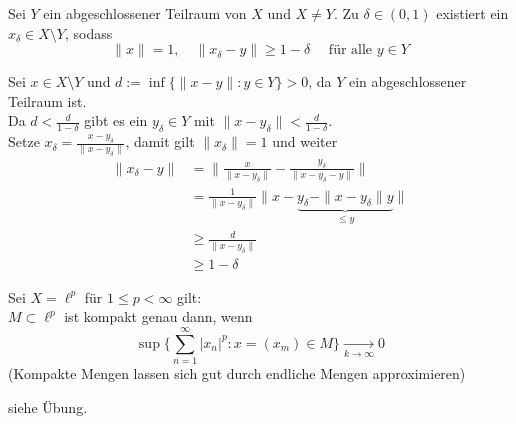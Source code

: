 \begin{lemma}[Riesz] \label{lemma:6.3-riesz} 
	Sei $Y$ ein abgeschlossener Teilraum von $X$ und $X \neq Y$. Zu $\delta \in (0, 1)$ existiert ein $x_{\delta} \in X \setminus Y$, sodass
	\[ \| x \| = 1, \quad \| x_{\delta} - y\| \geq 1 - \delta \quad \text{ für alle } y \in Y \]
\end{lemma}
\begin{beweis}
	Sei $x \in X \setminus Y$ und $d := \inf \{ \| x - y \|: y \in Y \} > 0$, da $Y$ ein abgeschlossener Teilraum ist. \\
	Da $ d < \frac{d}{1 - \delta}$ gibt es ein $y_{\delta} \in Y$ mit $\| x - y_{\delta} \| < \frac{d}{1 -  \delta}$. \\ 
	Setze $x_{\delta} = \frac{x - y_{\delta}}{\| x - y_{\delta} \|}$, damit gilt $\| x_{\delta} \| = 1$ und weiter 
	\begin{align*}
		\| x_{\delta} - y \| & = \| \frac{x}{\| x - y_{\delta} \|} - \frac{y_\delta}{\| x - y_{\delta} - y\|} \|	\\
			& = \frac{1}{\| x - y_{\delta} \|} \| x - \underbrace{y_{\delta} - \| x - y_{\delta} \| y}_{\leq y} \| \\
			& \geq \frac{d}{\| x - y_{\delta} \|} \\
			& \geq 1 - \delta
	\end{align*}
\end{beweis}

\begin{beispiel}
	Sei $X = \ell^{p}$ für $1 \leq p < \infty$ gilt: \\
	$M \subset \ell^{p}$ ist kompakt genau dann, wenn
	\[ \sup \{ \sum_{ n = 1}^{\infty} |x_{n}|^{p} : x = (x_{m}) \in M \} \xrightarrow[k \rightarrow \infty]{} 0 \]	
	(Kompakte Mengen lassen sich gut durch endliche Mengen approximieren)
\end{beispiel}
\begin{beweis}
	siehe Übung.	
\end{beweis}

